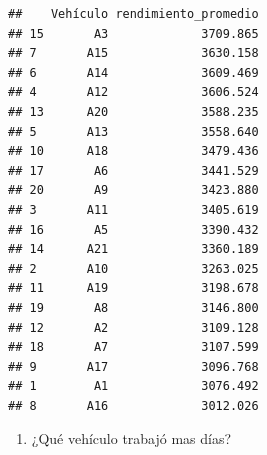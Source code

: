 \documentclass[]{article}
\newenvironment{Shaded}{\begin{snugshade}}{\end{snugshade}}
\newcommand{\KeywordTok}[1]{\textcolor[rgb]{0.13,0.29,0.53}{\textbf{#1}}}
\newcommand{\DataTypeTok}[1]{\textcolor[rgb]{0.13,0.29,0.53}{#1}}
\newcommand{\StringTok}[1]{\textcolor[rgb]{0.31,0.60,0.02}{#1}}
\newcommand{\CommentTok}[1]{\textcolor[rgb]{0.56,0.35,0.01}{\textit{#1}}}
\newcommand{\OperatorTok}[1]{\textcolor[rgb]{0.81,0.36,0.00}{\textbf{#1}}}
\newcommand{\NormalTok}[1]{#1}
\providecommand{\tightlist}{%
  \setlength{\itemsep}{0pt}\setlength{\parskip}{0pt}}
\begin{document}
\begin{verbatim}
##    Vehículo rendimiento_promedio
## 15       A3             3709.865
## 7       A15             3630.158
## 6       A14             3609.469
## 4       A12             3606.524
## 13      A20             3588.235
## 5       A13             3558.640
## 10      A18             3479.436
## 17       A6             3441.529
## 20       A9             3423.880
## 3       A11             3405.619
## 16       A5             3390.432
## 14      A21             3360.189
## 2       A10             3263.025
## 11      A19             3198.678
## 19       A8             3146.800
## 12       A2             3109.128
## 18       A7             3107.599
## 9       A17             3096.768
## 1        A1             3076.492
## 8       A16             3012.026
\end{verbatim}

\begin{enumerate}
\def\labelenumi{\alph{enumi}.}
\setcounter{enumi}{1}
\tightlist
\item
  ¿Qué vehículo trabajó mas días?
\end{enumerate}

\begin{Shaded}
\end{Shaded}
\end{document}
